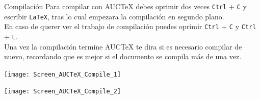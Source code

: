 \documentclass[12pt,aspectratio=43]{beamer}
\begin{document}
\begin{frame}{Compilación}{}
Para compilar con AUC{\TeX} debes oprimir dos veces \texttt{Ctrl} + \texttt{C} y escribir \texttt{LaTeX}, tras lo cual empezara la compilación en segundo plano.\pause\\[1em]

En caso de querer ver el trabajo de compilación puedes oprimir \texttt{Ctrl} + \texttt{C} y \texttt{Ctrl} + \texttt{L}.\pause\\[1em]

Una vez la compilación termine AUC{\TeX} te dira si es necesario compilar de nuevo, recordando que es mejor si el documento se compila más de una vez.
\end{frame}

\begin{frame}[plain]
\begin{center}
	\texttt{[image: Screen\_AUCTeX\_Compile\_1]}
\end{center}
\end{frame}

\begin{frame}[plain]
\begin{center}
	\texttt{[image: Screen\_AUCTeX\_Compile\_2]}
\end{center}
\end{frame}
\end{document}
